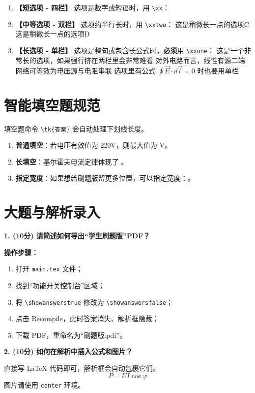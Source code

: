 \documentclass{elegantexam}
\begin{document}
\begin{enumerate}
    \item \textbf{【短选项 - 四栏】} 选项是数字或短语时，用 \texttt{\textbackslash xx}：\kh[A]

    \item \textbf{【中等选项 - 双栏】} 选项约半行长时，用 \texttt{\textbackslash xxtwo}：\kh[B]
          {这是稍微长一点的选项C}{这是稍微长一点的选项D}

    \item \textbf{【长选项 - 单栏】} 选项是整句或包含长公式时，\textbf{必须}用 \texttt{\textbackslash xxone}：\kh[C]
          {这是一个非常长的选项，如果强行挤在两栏里会非常难看}
          {对外电路而言，线性有源二端网络可等效为电压源与电阻串联}
          {选项里有公式 $\oint \vec{E} \cdot d\vec{l} = 0$ 时也要用单栏}
\end{enumerate}

\section{智能填空题规范}

填空题命令 \texttt{\textbackslash tk\{答案\}} 会自动处理下划线长度。

\begin{enumerate}
    \item \textbf{普通填空}：若电压有效值为 220V，则最大值为  V。
    \item \textbf{长填空}：基尔霍夫电流定律体现了 。
    \item \textbf{指定宽度}：如果想给刷题版留更多位置，可以指定宽度：。
\end{enumerate}

\section{大题与解析录入}

\textbf{1. (10分) 请简述如何导出“学生刷题版”PDF？}

\begin{solution}
    \textbf{操作步骤：}
    \begin{enumerate}
        \item 打开 \texttt{main.tex} 文件；
        \item 找到“功能开关控制台”区域；
        \item 将 \texttt{\textbackslash showanswerstrue} 修改为 \texttt{\textbackslash showanswersfalse}；
        \item 点击 Recompile，此时答案消失、解析框隐藏；
        \item 下载 PDF，重命名为“刷题版.pdf”。
    \end{enumerate}
\end{solution}

\vspace{2cm} %

\textbf{2. (10分) 如何在解析中插入公式和图片？}

\begin{solution}
    直接写 LaTeX 代码即可，解析框会自动包裹它们。
    $$ P = UI \cos \varphi $$
    图片请使用 \texttt{center} 环境。
\end{solution}
\end{document}
